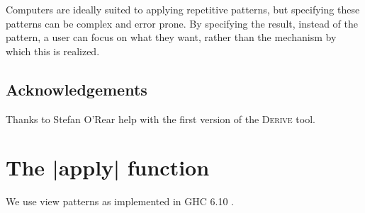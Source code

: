 \documentclass[preprint,draft]{sigplanconf}
\newcommand{\derive}{\textsc{Derive}}
\begin{document}
Computers are ideally suited to applying repetitive patterns, but specifying these patterns can be complex and error prone. By specifying the result, instead of the pattern, a user can focus on what they want, rather than the mechanism by which this is realized.

\subsection*{Acknowledgements}

Thanks to Stefan O'Rear help with the first version of the \derive{} tool.





\appendix
\section{The |apply| function}
\label{sec:apply}

We use view patterns as implemented in GHC 6.10 \cite{ghc}.
\end{document}
